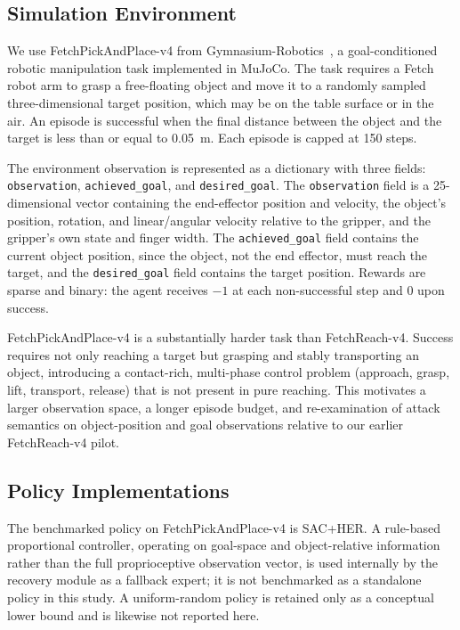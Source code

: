 \documentclass[conference]{IEEEtran}
\begin{document}
\subsection{Simulation Environment}

We use FetchPickAndPlace-v4 from Gymnasium-Robotics~\cite{gymnasiumrobotics2024}, a
goal-conditioned robotic manipulation task implemented in MuJoCo. The task requires a
Fetch robot arm to grasp a free-floating object and move it to a randomly sampled
three-dimensional target position, which may be on the table surface or in the air. An
episode is successful when the final distance between the object and the target is less
than or equal to 0.05~m. Each episode is capped at 150 steps.

The environment observation is represented as a dictionary with three fields:
\texttt{observation}, \texttt{achieved\_goal}, and \texttt{desired\_goal}. The
\texttt{observation} field is a 25-dimensional vector containing the end-effector
position and velocity, the object's position, rotation, and linear/angular velocity
relative to the gripper, and the gripper's own state and finger width. The
\texttt{achieved\_goal} field contains the current object position, since the object,
not the end effector, must reach the target, and the \texttt{desired\_goal} field
contains the target position. Rewards are sparse and binary: the agent receives $-1$ at
each non-successful step and $0$ upon success.

FetchPickAndPlace-v4 is a substantially harder task than FetchReach-v4. Success
requires not only reaching a target but grasping and stably transporting an object,
introducing a contact-rich, multi-phase control problem (approach, grasp, lift,
transport, release) that is not present in pure reaching. This motivates a larger
observation space, a longer episode budget, and re-examination of attack semantics on
object-position and goal observations relative to our earlier FetchReach-v4 pilot.

\subsection{Policy Implementations}

The benchmarked policy on FetchPickAndPlace-v4 is SAC+HER. A rule-based proportional
controller, operating on goal-space and object-relative information rather than the full
proprioceptive observation vector, is used internally by the recovery module as a
fallback expert; it is not benchmarked as a standalone policy in this study. A
uniform-random policy is retained only as a conceptual lower bound and is likewise not
reported here.
\end{document}
